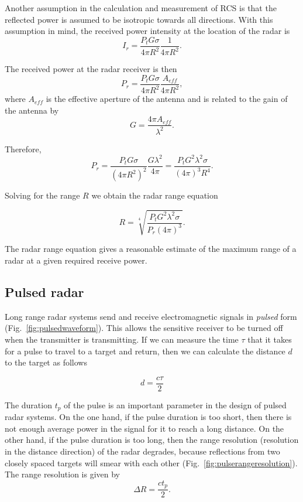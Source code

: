 \documentclass[letterpaper, 11pt]{article}
\begin{document}
Another assumption in the calculation and measurement of RCS is that the reflected power is assumed to be isotropic towards all directions. With this assumption in mind, the received power intensity at the location of the radar is
\[
I_r = \frac{P_t G \sigma}{4\pi R^2}\frac{1}{4\pi R^2}.
\]

The received power at the radar receiver is then
\[
P_r = \frac{P_t G \sigma}{4\pi R^2}\frac{A_{eff}}{4\pi R^2},
\]
where $A_{eff}$ is the effective aperture of the antenna and is related to the gain of the antenna by 
\[
G = \frac{4\pi A_{eff}}{\lambda^2}.
\]

Therefore, 
\[
P_r = \frac{P_t G \sigma}{\left( 4\pi R^2 \right)^2}\frac{G \lambda^2}{4\pi} =\frac{P_t G^2 \lambda^2 \sigma}{\left( 4\pi \right)^3 R^4}.
\]

Solving for the range $R$ we obtain the radar range equation

\begin{equation}
R = \sqrt[4]{\frac{P_t G^2 \lambda^2 \sigma}{P_r \left( 4\pi \right)^3} }.
\end{equation}

The radar range equation gives a reasonable estimate of the maximum range of a radar at a given required receive power. 

\subsection{Pulsed radar}

Long range radar systems send and receive electromagnetic signals in \textit{pulsed} form (Fig.~\ref{fig:pulsedwaveform}). This allows the sensitive receiver to be turned off when the transmitter is transmitting. If we can measure the time $\tau$ that it takes for a pulse to travel to a target and return, then we can calculate the distance $d$ to the target as follows

\begin{equation}
d = \frac{c\tau}{2}
\end{equation}

The duration $t_p$ of the pulse is an important parameter in the design of pulsed radar systems. On the one hand, if the pulse duration is too short, then there is not enough average power in the signal for it to reach a long distance. On the other hand, if the pulse duration is too long, then the range resolution (resolution in the distance direction) of the radar degrades, because reflections from two closely spaced targets will smear with each other (Fig.~\ref{fig:pulserangeresolution}). The range resolution is given by 
\begin{equation}
\Delta R = \frac{ct_p}{2}.
\end{equation}
\end{document}
